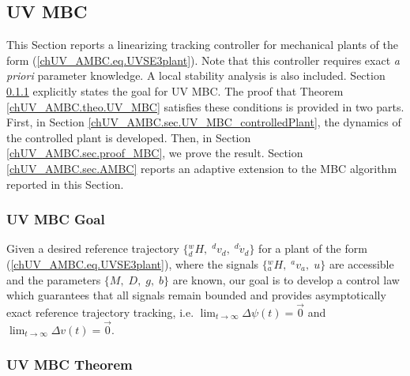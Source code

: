 \subsection{\acs{UV} \acs{MBC}}
\label{chUV_AMBC.sec.MBC}

This Section reports a linearizing tracking controller for mechanical
plants of the form (\ref{chUV_AMBC.eq.UVSE3plant}). Note that this
controller requires exact {\it a priori} parameter knowledge. 
%
A local stability analysis is also included. 
%
Section \ref{chUV_AMBC.sec.MBC_goal} explicitly states the goal for \ac{UV}
\ac{MBC}.
%
The proof that Theorem \ref{chUV_AMBC.theo.UV_MBC} satisfies these
conditions is provided in two parts.
%
First, in Section \ref{chUV_AMBC.sec.UV_MBC_controlledPlant}, the
dynamics of the controlled plant is developed.
%
Then, in Section \ref{chUV_AMBC.sec.proof_MBC}, we prove the
result.
%
Section \ref{chUV_AMBC.sec.AMBC} reports an adaptive extension to
the \ac{MBC} algorithm reported in this Section.



\subsubsection{\acs{UV} \acs{MBC} Goal}
\label{chUV_AMBC.sec.MBC_goal}

Given a desired reference trajectory
$\{{^w_d}H,\;{^d}v_d,\;{^d}\dot{v}_d \}$ for a plant of the form
(\ref{chUV_AMBC.eq.UVSE3plant}), where the signals
$\{{^w_a}H,\;{^a}v_a,\; u\}$ are accessible and the parameters
$\{M,\;D,\; g,\; b\}$ are known, our goal is to develop a control law
{} which guarantees that all signals remain bounded and
provides asymptotically exact reference trajectory tracking, i.e.
$\lim_{t\to \infty}\Delta \psi(t)=\vec{0}$ and $\lim_{t\to
  \infty}\Delta v(t)=\vec{0}$.

\subsubsection{\acs{UV} \acs{MBC} Theorem}


